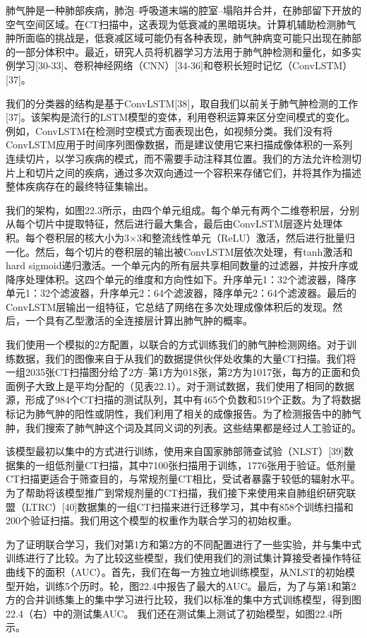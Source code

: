 肺气肿是一种肺部疾病，肺泡--呼吸道末端的腔室--塌陷并合并，在肺部留下开放的空气空间区域。在CT扫描中，这表现为低衰减的黑暗斑块。计算机辅助检测肺气肿所面临的挑战是，低衰减区域可能仍有各种表现，肺气肿病变可能只出现在肺部的一部分体积中。最近，研究人员将机器学习方法用于肺气肿检测和量化，如多实例学习[30-33]、卷积神经网络（CNN）[34-36]和卷积长短时记忆（ConvLSTM）[37]。

我们的分类器的结构是基于ConvLSTM[38]，取自我们以前关于肺气肿检测的工作[37]。该架构是流行的LSTM模型的变体，利用卷积运算来区分空间模式的变化。例如，ConvLSTM在检测时空模式方面表现出色，如视频分类。我们没有将ConvLSTM应用于时间序列图像数据，而是建议使用它来扫描成像体积的一系列连续切片，以学习疾病的模式，而不需要手动注释其位置。我们的方法允许检测切片上和切片之间的疾病，通过多次双向通过一个容积来存储它们，并将其作为描述整体疾病存在的最终特征集输出。

我们的架构，如图22.3所示，由四个单元组成。每个单元有两个二维卷积层，分别从每个切片中提取特征，然后进行最大集合，最后由ConvLSTM层逐片处理体积。每个卷积层的核大小为3×3和整流线性单元（ReLU）激活，然后进行批量归一化。然后，每个切片的卷积层的输出被ConvLSTM层依次处理，有tanh激活和hard sigmoid递归激活。一个单元内的所有层共享相同数量的过滤器，并按升序或降序处理体积。这四个单元的维度和方向性如下。升序单元1：32个滤波器，降序单元1：32个滤波器，升序单元2：64个滤波器，降序单元2：64个滤波器。最后的ConvLSTM层输出一组特征，它总结了网络在多次处理成像体积后的发现。然后，一个具有乙型激活的全连接层计算出肺气肿的概率。

我们使用一个模拟的2方配置，以联合的方式训练我们的肺气肿检测网络。对于训练数据，我们的图像来自于从我们的数据提供伙伴处收集的大量CT扫描。我们将一组2035张CT扫描图分给了2方--第1方为018张，第2方为1017张，每方的正面和负面例子大致上是平均分配的（见表22.1）。对于测试数据，我们使用了相同的数据源，形成了984个CT扫描的测试队列，其中有465个负数和519个正数。为了将数据标记为肺气肿的阳性或阴性，我们利用了相关的成像报告。为了检测报告中的肺气肿，我们搜索了肺气肿这个词及其同义词的列表。这些结果都是经过人工验证的。

该模型最初以集中的方式进行训练，使用来自国家肺部筛查试验（NLST）[39]数据集的一组低剂量CT扫描，其中7100张扫描用于训练，1776张用于验证。低剂量CT扫描更适合于筛查目的，与常规剂量CT相比，受试者暴露于较低的辐射水平。为了帮助将该模型推广到常规剂量的CT扫描，我们接下来使用来自肺组织研究联盟（LTRC）[40]数据集的一组CT扫描来进行迁移学习，其中有858个训练扫描和200个验证扫描。我们用这个模型的权重作为联合学习的初始权重。

为了证明联合学习，我们对第1方和第2方的不同配置进行了一些实验，并与集中式训练进行了比较。为了比较这些模型，我们使用我们的测试集计算接受者操作特征曲线下的面积（AUC）。首先，我们在每一方独立地训练模型，从NLST的初始模型开始，训练5个历时。轮，图22.4中报告了最大的AUC。最后，为了与第1和第2方的合并训练集上的集中学习进行比较，我们以标准的集中方式训练模型，得到图22.4（右）中的测试集AUC。
我们还在测试集上测试了初始模型，如图22.4所示。


